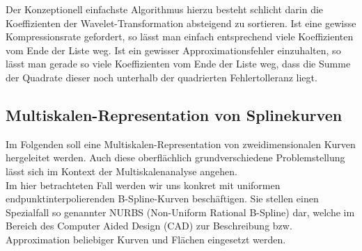 Der Konzeptionell einfachste Algorithmus hierzu besteht schlicht darin die Koeffizienten der Wavelet-Transformation absteigend zu sortieren. Ist eine gewisse Kompressionsrate gefordert, so lässt man einfach entsprechend viele Koeffizienten vom Ende der Liste weg. Ist ein gewisser Approximationsfehler einzuhalten, so lässt man gerade so viele Koeffizienten vom Ende der Liste weg, dass die Summe der Quadrate dieser noch unterhalb der quadrierten Fehlertolleranz liegt.
%

\subsection{Multiskalen-Representation von Splinekurven}
%
%
%
%
Im Folgenden soll eine Multiskalen-Representation von zweidimensionalen Kurven hergeleitet werden. Auch diese oberflächlich grundverschiedene Problemstellung lässt sich im Kontext der Multiskalenanalyse angehen. \\
%
Im hier betrachteten Fall werden wir uns konkret mit uniformen endpunktinterpolierenden B-Spline-Kurven beschäftigen. Sie stellen einen Spezialfall so genannter NURBS (Non-Uniform Rational B-Spline) dar, welche im Bereich des Computer Aided Design (CAD) zur Beschreibung bzw. Approximation beliebiger Kurven und Flächen eingesetzt werden.
%
